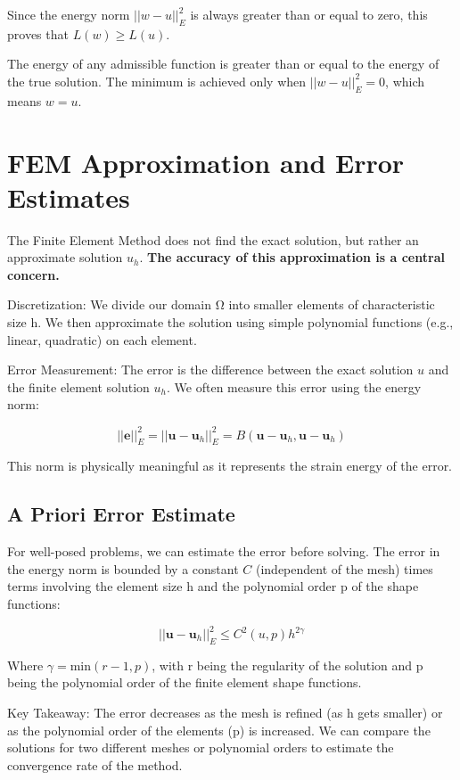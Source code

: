 \documentclass[
  11pt,
  a4paper,
]{scrbook}
\begin{document}
Since the energy norm \(||w-u||_E^2\) is always greater than or equal to
zero, this proves that \(L(w)\geq L(u)\).

The energy of any admissible function is greater than or equal to the
energy of the true solution. The minimum is achieved only when
\(||w-u||_E^2=0\), which means \(w=u\).

\section{FEM Approximation and Error
Estimates}\label{fem-approximation-and-error-estimates}

The Finite Element Method does not find the exact solution, but rather
an approximate solution \(u_h\). \textbf{The accuracy of this
approximation is a central concern.}

Discretization: We divide our domain Ω into smaller elements of
characteristic size h. We then approximate the solution using simple
polynomial functions (e.g., linear, quadratic) on each element.

Error Measurement: The error is the difference between the exact
solution \(u\) and the finite element solution \(u_h\). We often measure
this error using the energy norm:

\[|| \mathbf{e} ||^2_E = || \mathbf{u} - \mathbf{u}_h ||^2_E = B(\mathbf{u} - \mathbf{u}_h, \mathbf{u} - \mathbf{u}_h)\]

This norm is physically meaningful as it represents the strain energy of
the error.

\subsection{A Priori Error Estimate}\label{a-priori-error-estimate}

For well-posed problems, we can estimate the error before solving. The
error in the energy norm is bounded by a constant \(C\) (independent of
the mesh) times terms involving the element size h and the polynomial
order p of the shape functions:

\[|| \mathbf{u} - \mathbf{u}_h ||^2_E \le C^2(u,p) h^{2\gamma}\]

Where \(\gamma=\text{min}(r-1,p)\), with r being the regularity of the
solution and p being the polynomial order of the finite element shape
functions.

Key Takeaway: The error decreases as the mesh is refined (as h gets
smaller) or as the polynomial order of the elements (p) is increased. We
can compare the solutions for two different meshes or polynomial orders
to estimate the convergence rate of the method.
\end{document}
